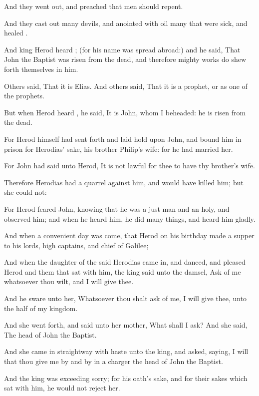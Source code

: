 {And they went
out, and
preached
that men should
repent.

And they cast
out
many
devils,
and
anointed with
oil
many that were
sick,
and
healed
{}.

And
king
Herod
heard
{}; (for
his
name
was spread
abroad:)
and he
said,
That
John the
Baptist was
risen
from the
dead,
and
therefore
mighty works do shew forth
themselves
in
him.

Others
said,
That it
is
Elias.
And
others
said,
That it
is a
prophet,
or
as
one of the
prophets.

But when
Herod
heard
{}, he
said,
It
is
John,
whom
I
beheaded:
he is
risen
from the
dead.

For
Herod
himself had sent
forth and laid
hold upon
John,
and
bound
him
in
prison
for
Herodias’ sake,
his
brother
Philip’s
wife:
for he had
married
her.

For
John had
said unto
Herod, It
is
not
lawful for
thee to
have
thy
brother’s
wife.

Therefore
Herodias had a
quarrel against
him,
and
would have
killed
him;
but she
could
not:

For
Herod
feared
John,
knowing that
he was a
just
man
and an
holy,
and
observed
him;
and when he
heard
him, he
did many
things,
and
heard
him
gladly.

And
when a
convenient
day was
come, that
Herod on
his
birthday
made a
supper to
his
lords, high
captains,
and
chief
{} of
Galilee;

And when the
daughter of the
said
Herodias came
in,
and
danced,
and
pleased
Herod
and
them that sat with
him, the
king
said unto the
damsel,
Ask of
me
whatsoever thou
wilt,
and I will
give
{}
thee.

And he
sware unto
her,
Whatsoever thou shalt
ask of
me, I will
give
{}
thee,
unto the
half of
my
kingdom.

And she went
forth, and
said unto
her
mother,
What shall I
ask?
And she
said, The
head of
John the
Baptist.

And she came
in
straightway
with
haste
unto the
king, and
asked,
saying, I
will
that thou
give
me by and
by
in a
charger the
head of
John the
Baptist.

And the
king
was exceeding
sorry;
{}
for his
oath’s sake,
and for their sakes
which sat with
him, he
would
not
reject
her.

}
